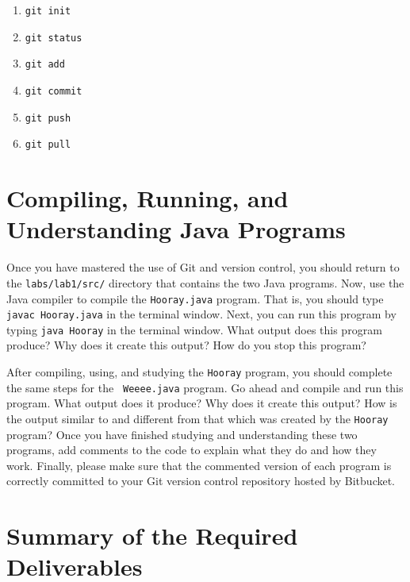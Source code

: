 \begin{enumerate} 
			
	\item {\tt git init}

	\item {\tt git status}

	\item {\tt git add} 

	\item {\tt git commit}

	\item {\tt git push}

	\item {\tt git pull} 

\end{enumerate}

\section*{Compiling, Running, and Understanding Java Programs}

  Once you have mastered the use of Git and version control, you should return to the {\tt labs/lab1/src/} directory that
  contains the two Java programs. Now, use the Java compiler to compile the {\tt Hooray.java} program.  That is, you
  should type {\tt javac Hooray.java} in the terminal window.  Next, you can run this program by typing {\tt java
  Hooray} in the terminal window.  What output does this program produce?  Why does it create this output? How do you
  stop this program? 

  After compiling, using, and studying the {\tt Hooray} program, you should complete the same steps for the {\tt
  Weeee.java} program. Go ahead and compile and run this program.  What output does it produce? Why does it create this
  output? How is the output similar to and different from that which was created by the {\tt Hooray} program? Once you
  have finished studying and understanding these two programs, add comments to the code to explain what they do and how
  they work. Finally, please make sure that the commented version of each program is correctly committed to your Git
  version control repository hosted by Bitbucket.
  

\section*{Summary of the Required Deliverables}

